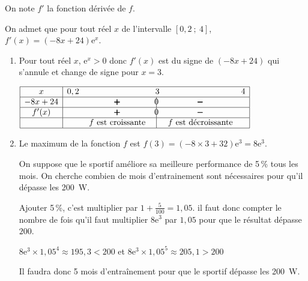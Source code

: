 \documentclass[10pt]{article}
\providecommand{\e}{{\mathrm{e}}}
\begin{document}
On note $f'$ la fonction dérivée de $f$. 

On admet que pour tout réel $x$ de l'intervalle $[0,2~;~4]$,
$f'(x)=(-8x+24)\e^{x}.$

\begin{enumerate}
\item
Pour tout réel $x$, $\e^{x}>0$ donc $f'(x)$ est du signe de $(-8x+24)$ qui s'annule et change de signe pour $x=3$.

\begin{center}
{\renewcommand{\arraystretch}{1.3}
\def\esp{\hspace*{2.5cm}}
\def\hauteur{0pt}
$\begin{array}{|c| *4{c} c|}
\hline
 x & 0,2  & \esp & 3 & \esp & 4 \\
  \hline
-8x+24 &  &  \pmb{+} & \vline\hspace{-2.7pt}0 & \pmb{-} & \\  
 \hline
f'(x) &  &  \pmb{+} & \vline\hspace{-2.7pt}0 & \pmb{-} & \\  
\hline
 && f \text{ est croissante} & \vline\hspace{-2.7pt}{\phantom 0} & f \text{ est décroissante} & \\
\hline
\end{array}$
}
\end{center}


\item 
Le maximum de la fonction $f$ est $f(3)= (-8\times 3+32)\e^{3}=8\e^{3}$.

On suppose que le sportif améliore sa meilleure performance de 5\,\% tous les mois. On cherche combien de mois d'entrainement sont nécessaires pour qu'il dépasse les 200~W.

Ajouter 5\,\%, c'est multiplier par $1+\frac{5}{100} = 1,05$. il faut donc compter le nombre de fois qu'il faut multiplier $8\e^{3}$ par $1,05$ pour que le résultat dépasse $200$.

$8\e^{3} \times 1,05^4 \approx 195,3 < 200$ et $8\e^{3} \times 1,05^5 \approx 205,1 > 200$ 

Il faudra donc 5 mois d'entraînement pour que le sportif dépasse les 200~W.

\end{enumerate}

\vspace{0.5cm}
\end{document}
